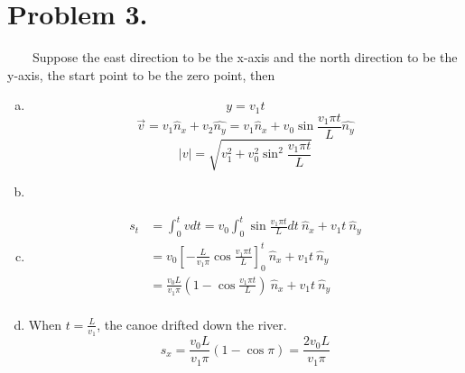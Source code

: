 \documentclass{article}
\begin{document}
\section*{Problem 3.}
	$\quad \quad$Suppose the east direction to be the x-axis and the north direction to be the y-axis, the start point to be the zero point, then
	\begin{enumerate}[(a)]
	\item
		$$y=v_1t$$
		$$\vec{v}=v_1\hat{n}_x+v_2\hat{n_y}=v_1\hat{n}_x+v_0\sin\frac{v_1\pi t}{L}\hat{n_y}$$
		$$|v|=\sqrt{v_1^2+v_0^2\sin^2\frac{v_1\pi t}{L}}$$
	\item
	\item
		\begin{align*}
		s_t&=\int_0^tvdt=v_0\int_0^t\sin\frac{v_1\pi t}{L}dt\ \hat{n}_x+v_1t\ \hat{n}_y\\
		&=v_0\left[ -\frac{L}{v_1\pi}\cos \frac{v_1\pi t}{L}\right]_0^t\ \hat{n}_x+v_1t\ \hat{n}_y\\
		&=\frac{v_0L}{v_1\pi}\left( 1-\cos \frac{v_1\pi t}{L} \right)\ \hat{n}_x+v_1t\ \hat{n}_y\\
		\end{align*}
	\item
		When $t=\frac{L}{v_1}$, the canoe drifted down the river.\\
		$$s_x=\frac{v_0L}{v_1\pi}\left( 1-\cos \pi \right)=\frac{2v_0L}{v_1\pi}$$
	\end{enumerate}
\end{document}
